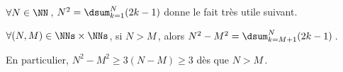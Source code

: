 $\forall N \in \NN$\,, $N^2 = \dsum_{k=1}^{N} (2 k - 1)$ donne le fait très utile suivant.




\begin{fact} \label{dist-square}
	$\forall (N, M) \in \NNs \times \NNs$, 
	si $N > M$\,, alors $N^2 - M^2 = \dsum_{k=M+1}^{N} (2 k - 1)$\,.
	
	En particulier, $N^2 - M^2 \geq 3 (N - M) \geq 3$ dès que $N > M$\,.
\end{fact}




%	
%	
%
